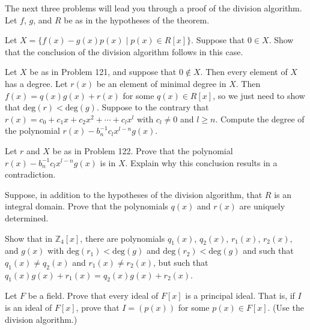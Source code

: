 The next three problems will lead you through a proof of the division algorithm. Let \(f\), \(g\), and \(R\) be as in the hypotheses of the theorem.

\begin{problem}
Let \(X = \{f(x)-g(x)p(x) \mid p(x) \in R[x] \}\). Suppose that \(0 \in X\). Show that the conclusion of the division algorithm follows in this case.
\end{problem}

\begin{problem}
Let \(X\) be as in Problem 121, and suppose that \(0 \not\in X\). Then every element of \(X\) has a degree. Let \(r(x)\) be an element of minimal degree in \(X\). Then \(f(x) = q(x)g(x) + r(x)\) for some \(q(x)\in R[x]\), so we just need to show that \(\mbox{deg}(r) < \mbox{deg}(g) \). Suppose to the contrary that \(r(x) = c_0 + c_1x + c_2x^2 + \cdots + c_lx^l\) with \(c_l\neq 0\) and \(l \geq n\). Compute the degree of the polynomial \(r(x)-b_n^{-1}c_lx^{l-n}g(x)\).
\end{problem}

\begin{problem}
Let \(r\) and \(X\) be as in  Problem 122. Prove that the polynomial \(r(x)-b_n^{-1}c_lx^{l-n}g(x)\) is in \(X\). Explain why this conclusion results in a contradiction.
\end{problem}

\begin{problem}
Suppose, in addition to the hypotheses of the division algorithm, that \(R\) is an integral domain. Prove that the polynomials \(q(x)\) and \(r(x)\) are uniquely determined.
\end{problem}

\begin{problem}
Show that in \(\mathbb{Z}_4[x]\), there are polynomials \(q_1(x)\), \(q_2(x)\), \(r_1(x)\), \(r_2(x)\), and \(g(x)\) with \(\mbox{deg}(r_1)<\mbox{deg}(g)\) and \(\mbox{deg}(r_2)<\mbox{deg}(g)\) and such that \(q_1(x) \neq q_2(x)\) and \(r_1(x) \neq r_2(x)\), but such that \(q_1(x)g(x) +r_1(x) = q_2(x)g(x)+r_2(x)\).
\end{problem}

\begin{problem}\label{prob:fieldprin}
Let \(F\) be a field. Prove that every ideal of \(F[x]\) is a principal ideal. That is, if \(I\) is an ideal of \(F[x]\), prove that \(I = \left(p(x)\right)\) for some \(p(x) \in F[x]\). (Use the division algorithm.)
\end{problem}

